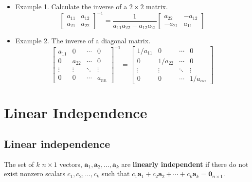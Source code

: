 \documentclass[a4paper,11pt]{article}
\begin{document}
\begin{itemize}
\item Example 1. Calculate the inverse of a \(2 \times 2\) matrix. 
\begin{equation*}
 \begin{bmatrix}
  a_{11} & a_{12} \\ 
  a_{21} & a_{22}
  \end{bmatrix}^{-1}
 =\frac{1}{a_{11}a_{22} - a_{12}a_{21}}
 \begin{bmatrix}
  a_{22} & -a_{12} \\ 
  -a_{21} & a_{11}
  \end{bmatrix}
\end{equation*}

\item Example 2. The inverse of a diagonal matrix. 
\begin{equation*}  
\begin{bmatrix}
a_{11} & 0 & \cdots & 0 \\
0 & a_{22} & \cdots & 0 \\
\vdots & \vdots & \ddots & \vdots \\
0 & 0 & \cdots & a_{nn}
\end{bmatrix}^{-1}
=
\begin{bmatrix}
1/a_{11} & 0 & \cdots & 0 \\
0 & 1/a_{22} & \cdots & 0 \\
\vdots & \vdots & \ddots & \vdots \\
0 & 0 & \cdots & 1/a_{nn}
\end{bmatrix}
\end{equation*}
\end{itemize}


\section{Linear Independence}
\label{sec:org32324a3}

\subsection{Linear independence}
\label{sec:org42e743f}

The set of \(k\) \(n \times 1\) vectors, \(\mathbf{a}_1, \mathbf{a}_2,
\ldots, \mathbf{a}_k\) are \textbf{linearly independent} if there do not exist
nonzero scalars \(c_1, c_2, \ldots, c_k\) such that \(c_1 \mathbf{a}_1 +
c_2 \mathbf{a}_2 + \cdots + c_k \mathbf{a}_k = \mathbf{0}_{n \times
1}\). 
\end{document}
